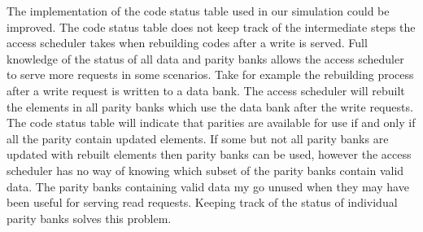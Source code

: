 The implementation of the code status table used in our simulation could be improved. The code status table does not keep track of the intermediate steps the access scheduler takes when rebuilding codes after a write is served. Full knowledge of the status of all data and parity banks allows the access scheduler to serve more requests in some scenarios. Take for example the rebuilding process after a write request is written to a data bank. The access scheduler will rebuilt the elements in all parity banks which use the data bank after the write requests. The code status table will indicate that parities are available for use if and only if all the parity contain updated elements. If some but not all parity banks are updated with rebuilt elements then parity banks can be used, however the access scheduler has no way of knowing which subset of the parity banks contain valid data. The  parity banks containing valid data my go unused when they may have been useful for serving read requests. Keeping track of the status of individual parity banks solves this problem. 


